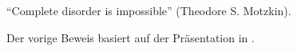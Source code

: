 \begin{bem}
	``Complete disorder is impossible'' (Theodore S. Motzkin). 
\end{bem} 

\begin{bem}
	Der vorige Beweis basiert auf der Präsentation in \cite{AZ02}. 
\end{bem} 









